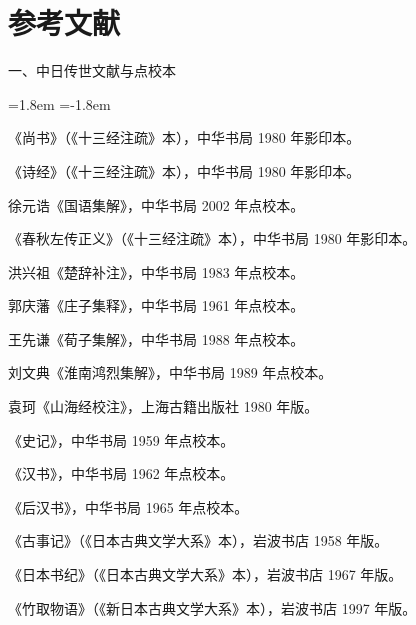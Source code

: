 \clearpage
\chapter*{参\quad 考\quad 文\quad 献}
{}

\begingroup
\footnotesize
\linespread{1.25}\selectfont
\setlength{\parindent}{0pt}\setlength{\parskip}{1.6pt}

一、中日传世文献与点校本
\par\vspace{1.5mm}
\begin{list}{}{\leftmargin=1.8em \itemindent=-1.8em \topsep=0pt \parsep=1.4pt \itemsep=0pt}
\item 《尚书》（《十三经注疏》本），中华书局 1980 年影印本。
\item 《诗经》（《十三经注疏》本），中华书局 1980 年影印本。
\item 徐元诰《国语集解》，中华书局 2002 年点校本。
\item 《春秋左传正义》（《十三经注疏》本），中华书局 1980 年影印本。
\item 洪兴祖《楚辞补注》，中华书局 1983 年点校本。
\item 郭庆藩《庄子集释》，中华书局 1961 年点校本。
\item 王先谦《荀子集解》，中华书局 1988 年点校本。
\item 刘文典《淮南鸿烈集解》，中华书局 1989 年点校本。
\item 袁珂《山海经校注》，上海古籍出版社 1980 年版。
\item 《史记》，中华书局 1959 年点校本。
\item 《汉书》，中华书局 1962 年点校本。
\item 《后汉书》，中华书局 1965 年点校本。
\item 《古事记》（《日本古典文学大系》本），岩波书店 1958 年版。
\item 《日本书纪》（《日本古典文学大系》本），岩波书店 1967 年版。
\item 《竹取物语》（《新日本古典文学大系》本），岩波书店 1997 年版。
\end{list}

